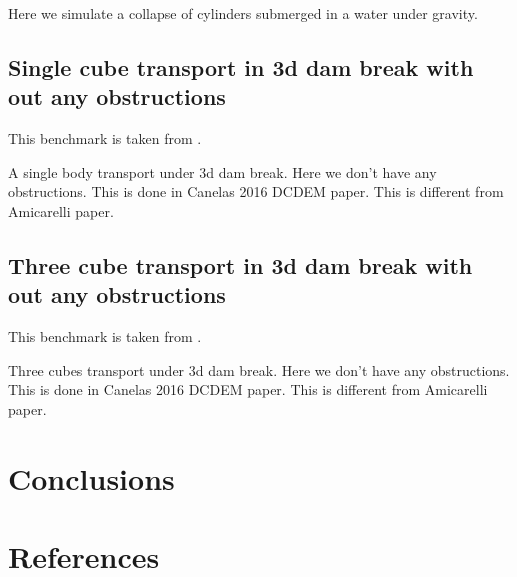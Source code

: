 \documentclass[preprint,12pt]{elsarticle}
\begin{document}
Here we simulate a collapse of cylinders submerged in a water under gravity.


\subsection{Single cube transport in 3d dam break with out any obstructions}
\label{sec:single-cube-transport-in-3d-dam-break-with-out-any-obstructions}

This benchmark is taken from \citet{ji2019coupled}.

A single body transport under 3d dam break. Here we don't have any
obstructions. This is done in Canelas 2016 DCDEM paper. This is different from
Amicarelli paper.


\subsection{Three cube transport in 3d dam break with out any obstructions}
\label{sec:three-cube-transport-in-3d-dam-break-with-out-any-obstructions}

This benchmark is taken from \citet{ji2019coupled}.

Three cubes transport under 3d dam break. Here we don't have any obstructions.
This is done in Canelas 2016 DCDEM paper. This is different from Amicarelli
paper.


\section{Conclusions}
\label{sec:conclusions}


\section*{References}


\end{document}
